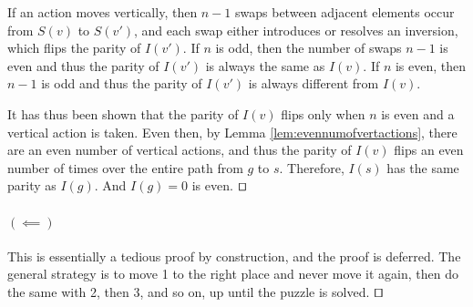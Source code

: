 \documentclass[runningheads]{llncs}
\begin{document}
If an action moves vertically, then $n-1$ swaps between adjacent elements occur from $S(v)$ to $S(v')$, and each swap either introduces or resolves an inversion, which flips the parity of $I(v')$. If $n$ is odd, then the number of swaps $n-1$ is even and thus the parity of $I(v')$ is always the same as $I(v)$. If $n$ is even, then $n-1$ is odd and thus the parity of $I(v')$ is always different from $I(v)$.

It has thus been shown that the parity of $I(v)$ flips only when $n$ is even and a vertical action is taken. Even then, by Lemma \ref{lem:evennumofvertactions}, there are an even number of vertical actions, and thus the parity of $I(v)$ flips an even number of times over the entire path from $g$ to $s$. Therefore, $I(s)$ has the same parity as $I(g)$. And $I(g) = 0$ is even.
$\qed$

\paragraph{$(\impliedby)$}
This is essentially a tedious proof by construction, and the proof is deferred. The general strategy is to move 1 to the right place and never move it again, then do the same with 2, then 3, and so on, up until the puzzle is solved.
$\qed$






\end{document}
